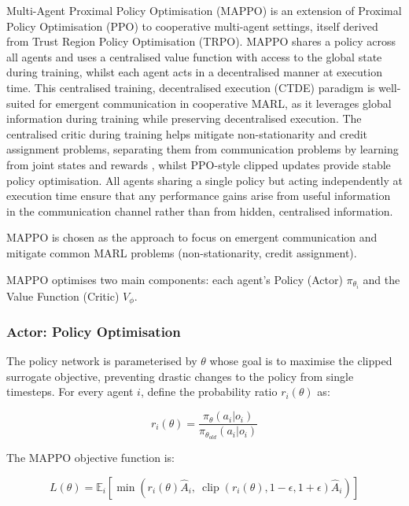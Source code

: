 Multi-Agent Proximal Policy Optimisation (MAPPO) \cite{MAPPO} is an extension of Proximal Policy Optimisation (PPO) \cite{PPO} to cooperative multi-agent settings, itself derived from Trust Region Policy Optimisation (TRPO)\cite{TRPO}.
MAPPO shares a policy across all agents and uses a centralised value function with access to the global state during training, whilst each agent acts in a decentralised manner at execution time.
This centralised training, decentralised execution (CTDE) \cite{CTDE} paradigm is well-suited for emergent communication in cooperative MARL, as it leverages global information during training while preserving decentralised execution.
The centralised critic during training helps mitigate non-stationarity and credit assignment problems, separating them from communication problems by learning from joint states and rewards \cite{ctde-mappo}, whilst PPO-style clipped updates provide stable policy optimisation.
All agents sharing a single policy but acting independently at execution time ensure that any performance gains arise from useful information in the communication channel rather than from hidden, centralised information.

MAPPO is chosen as the approach to focus on emergent communication and mitigate common MARL problems (non-stationarity, credit assignment).

MAPPO optimises two main components: each agent's Policy (Actor) ${\pi}_{{\theta}_{i}}$ and the Value Function (Critic) $V_{\phi}$.

\subsubsection{Actor: Policy Optimisation}
\label{sec:2.2.1}
The policy network is parameterised by $\theta$ whose goal is to maximise the clipped surrogate objective, preventing drastic changes to the policy from single timesteps.
For every agent $i$, define the probability ratio $r_i(\theta)$ as:

\begin{equation}
r_i(\theta) = \frac{\pi_{\theta}(a_i | o_i)}{\pi_{\theta_{old}}(a_i | o_i)}
\end{equation}

The MAPPO objective function is:

\begin{equation}
L(\theta) = \mathbb{E}_{i} \left[ \min \left( r_i(\theta) \hat{A}_i,\ \operatorname{clip}(r_i(\theta), 1-\epsilon, 1+\epsilon) \hat{A}_i \right) \right]
\end{equation}

